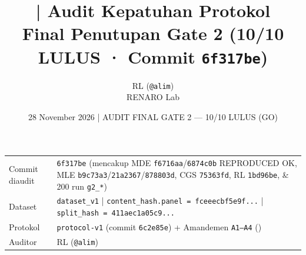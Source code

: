 \documentclass[11pt,a4paper]{article}
\title{\jobid{RL-H5-02} | Audit Kepatuhan Protokol\\
\large Final Penutupan Gate 2 (10/10 LULUS · Commit \texttt{6f317be})}
\author{RL (\texttt{@alim}) \\ \small RENARO Lab}
\date{28 November 2026 \quad | \quad \textcolor{green!50!black}{AUDIT FINAL GATE 2 — 10/10 LULUS (GO)}}
\begin{document}
\maketitle

\begin{table}[H]
\centering
\small
\begin{tabular}{@{}L{3.6cm}L{10.6cm}@{}}
\toprule
Commit diaudit & \texttt{6f317be} (mencakup MDE \texttt{f6716aa}/\texttt{6874c0b} REPRODUCED OK, MLE \texttt{b9c73a3}/\texttt{21a2367}/\texttt{878803d}, CGS \texttt{75363fd}, RL \texttt{1bd96be}, \& 200 run \texttt{g2\_*}) \\
Dataset & \texttt{dataset\_v1} | \texttt{content\_hash.panel = fceeecbf5e9f...} | \texttt{split\_hash = 411aec1a05c9...} \\
Protokol & \texttt{protocol-v1} (commit \texttt{6c2e85e}) + Amandemen \texttt{A1--A4} () \\
Auditor & RL (\texttt{@alim}) \\
\bottomrule
\end{tabular}
\end{table}
\end{document}
